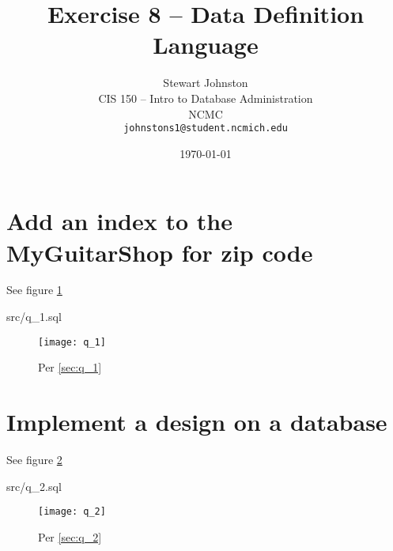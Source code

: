 \documentclass{article}
\title{Exercise 8 -- Data Definition Language}
\author{Stewart Johnston\\
  {CIS 150 -- Intro to Database Administration}\\
  {NCMC}\\
  {\texttt{johnstons1@student.ncmich.edu}}
}
\date{\today}
\begin{document}

\maketitle

\tableofcontents
\listoffigures

\section{Add an index to the MyGuitarShop for zip code}

See figure \ref{fig:q_1}
\label{sec:q_1}
\begin{lstinputlisting}[float]{src/q_1.sql}
\end{lstinputlisting}

\begin{figure}[H]\centering
	\caption{Per \ref{sec:q_1}}
	\texttt{[image: q\_1]}
	\label{fig:q_1}
\end{figure}

\section{Implement a design on a database}

See figure \ref{fig:q_2}
\label{sec:q_2}
\begin{lstinputlisting}[float]{src/q_2.sql}
\end{lstinputlisting}

\begin{figure}[H]\centering
	\caption{Per \ref{sec:q_2}}
	\texttt{[image: q\_2]}
	\label{fig:q_2}
\end{figure}
\end{document}
